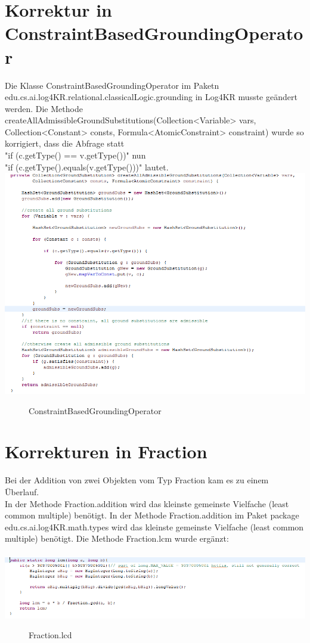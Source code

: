 \documentclass[draft]{scrreprt}
\begin{document}
{\section{Korrektur in ConstraintBasedGroundingOperator}
\label{sec:Korrektur1}
Die Klasse ConstraintBasedGroundingOperator im Paketn\\ edu.cs.ai.log4KR.relational.classicalLogic.grounding in Log4KR musste geändert werden. Die Methode createAllAdmissibleGroundSubstitutions(Collection<Variable> vars,
Collection<Constant> consts, Formula<AtomicConstraint> constraint) wurde so korrigiert, dass die Abfrage statt\\
 "{}if (c.getType() == v.getType())"{} 
nun \\
"{}if (c.getType().equals(v.getType()))"{} lautet.\\
\includegraphics[scale = 0.95]{Graphics/Aenderung_1}
\begin{figure}[h]
	\caption{ConstraintBasedGroundingOperator}
\end{figure}


\section{Korrekturen in Fraction} \label{Korrektur_Fraction}
Bei der Addition von zwei Objekten vom Typ Fraction kam es zu einem Überlauf.\\
In der Methode Fraction.addition wird das kleinste gemeinste Vielfache (least common multiple) benötigt. 
In der Methode Fraction.addition im Paket package \\edu.cs.ai.log4KR.math.types wird das kleinste gemeinste Vielfache (least common multiple) benötigt. 
Die Methode Fraction.lcm wurde ergänzt:\\
\\
\includegraphics[scale = 0.95]{Graphics/Aenderung_221}
\begin{figure}[h]
	\caption{Fraction.lcd}
\end{figure}

}
\end{document}
